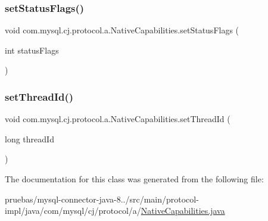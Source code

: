 \subsubsection{\texorpdfstring{set\+Status\+Flags()}{setStatusFlags()}}
{\footnotesize\ttfamily void com.\+mysql.\+cj.\+protocol.\+a.\+Native\+Capabilities.\+set\+Status\+Flags (\begin{DoxyParamCaption}\item[{int}]{status\+Flags }\end{DoxyParamCaption})}

\mbox{\label{classcom_1_1mysql_1_1cj_1_1protocol_1_1a_1_1_native_capabilities_a34aa8f4f2048601844708e7130d5d7c3}} 
\subsubsection{\texorpdfstring{set\+Thread\+Id()}{setThreadId()}}
{\footnotesize\ttfamily void com.\+mysql.\+cj.\+protocol.\+a.\+Native\+Capabilities.\+set\+Thread\+Id (\begin{DoxyParamCaption}\item[{long}]{thread\+Id }\end{DoxyParamCaption})}



The documentation for this class was generated from the following file\+:\begin{DoxyCompactItemize}
\item 
pruebas/mysql-\/connector-\/java-\/8../src/main/protocol-\/impl/java/com/mysql/cj/protocol/a/\mbox{\hyperlink{_native_capabilities_8java}{Native\+Capabilities.\+java}}\end{DoxyCompactItemize}
